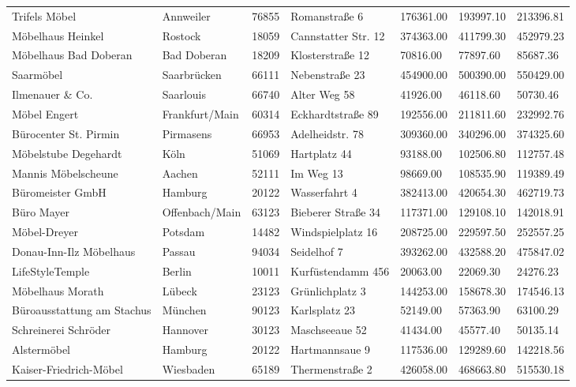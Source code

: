 {\begin{longtable}{lllllll}
        Trifels Möbel & Annweiler & 76855 & Romanstraße 6 & 176361.00 & 193997.10 & 213396.81 \\ 
        Möbelhaus Heinkel & Rostock & 18059 & Cannstatter Str. 12 & 374363.00 & 411799.30 & 452979.23 \\ 
        Möbelhaus Bad Doberan & Bad Doberan & 18209 & Klosterstraße 12 & 70816.00 & 77897.60 & 85687.36 \\ 
        Saarmöbel & Saarbrücken & 66111 & Nebenstraße 23 & 454900.00 & 500390.00 & 550429.00 \\ 
        Ilmenauer \& Co. & Saarlouis & 66740 & Alter Weg 58 & 41926.00 & 46118.60 & 50730.46 \\ 
        Möbel Engert & Frankfurt/Main & 60314 & Eckhardtstraße 89 & 192556.00 & 211811.60 & 232992.76 \\ 
        Bürocenter St. Pirmin & Pirmasens & 66953 & Adelheidstr. 78 & 309360.00 & 340296.00 & 374325.60 \\ 
        Möbelstube Degehardt & Köln & 51069 & Hartplatz 44 & 93188.00 & 102506.80 & 112757.48 \\ 
        Mannis Möbelscheune & Aachen & 52111 & Im Weg 13 & 98669.00 & 108535.90 & 119389.49 \\ 
        Büromeister GmbH & Hamburg & 20122 & Wasserfahrt 4 & 382413.00 & 420654.30 & 462719.73 \\ 
        Büro Mayer & Offenbach/Main & 63123 & Bieberer Straße 34 & 117371.00 & 129108.10 & 142018.91 \\ 
        Möbel-Dreyer & Potsdam & 14482 & Windspielplatz 16 & 208725.00 & 229597.50 & 252557.25 \\ 
        Donau-Inn-Ilz Möbelhaus & Passau & 94034 & Seidelhof 7 & 393262.00 & 432588.20 & 475847.02 \\ 
        LifeStyleTemple & Berlin & 10011 & Kurfüstendamm 456 & 20063.00 & 22069.30 & 24276.23 \\ 
        Möbelhaus Morath & Lübeck & 23123 & Grünlichplatz 3 & 144253.00 & 158678.30 & 174546.13 \\ 
        Büroausstattung am Stachus & München & 90123 & Karlsplatz 23 & 52149.00 & 57363.90 & 63100.29 \\ 
        Schreinerei Schröder & Hannover & 30123 & Maschseeaue 52 & 41434.00 & 45577.40 & 50135.14 \\ 
        Alstermöbel & Hamburg & 20122 & Hartmannsaue 9 & 117536.00 & 129289.60 & 142218.56 \\ 
        Kaiser-Friedrich-Möbel & Wiesbaden & 65189 & Thermenstraße 2 & 426058.00 & 468663.80 & 515530.18 \\ 

\end{longtable}}
